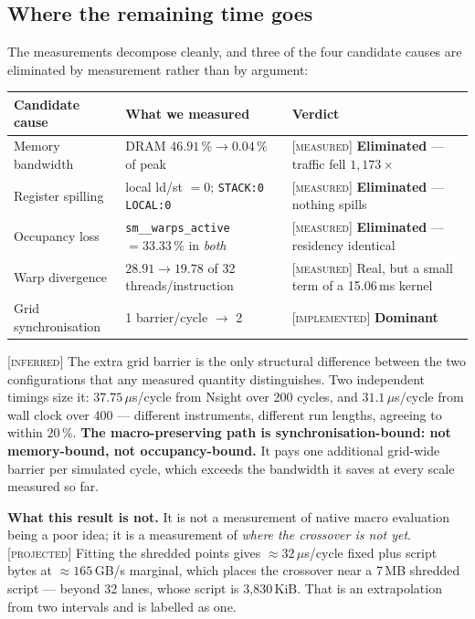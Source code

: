 \documentclass[11pt]{article}
\newcommand{\M}{\textcolor{blue!45!black}{\scriptsize\textsc{[measured]}}}
\newcommand{\I}{\textcolor{note}{\scriptsize\textsc{[implemented]}}}
\newcommand{\F}{\textcolor{purple!60!black}{\scriptsize\textsc{[inferred]}}}
\newcommand{\Pj}{\textcolor{red!55!black}{\scriptsize\textsc{[projected]}}}
\newcommand{\code}[1]{\texttt{\small #1}}
\begin{document}
\subsection{Where the remaining time goes}

The measurements decompose cleanly, and three of the four candidate causes are
eliminated by measurement rather than by argument:

\begin{center}\small
\begin{tabular}{@{}lll@{}}
\toprule
Candidate cause & What we measured & Verdict\\
\midrule
Memory bandwidth      & DRAM $46.91\,\% \to 0.04\,\%$ of peak        & \M{} \textbf{Eliminated} --- traffic fell $1{,}173\times$\\
Register spilling     & local ld/st $=0$; \code{STACK:0 LOCAL:0}     & \M{} \textbf{Eliminated} --- nothing spills\\
Occupancy loss        & \code{sm\_\_warps\_active} $=33.33\,\%$ in \emph{both} & \M{} \textbf{Eliminated} --- residency identical\\
Warp divergence       & $28.91 \to 19.78$ of 32 threads/instruction  & \M{} Real, but a small term of a 15.06\,ms kernel\\
Grid synchronisation  & 1 barrier/cycle $\to$ 2                      & \I{} \textbf{Dominant}\\
\bottomrule
\end{tabular}
\end{center}

\F{} The extra grid barrier is the only structural difference between the two
configurations that any measured quantity distinguishes. Two independent timings size
it: $37.75\,\mu$s/cycle from Nsight over 200 cycles, and $31.1\,\mu$s/cycle from wall
clock over 400 --- different instruments, different run lengths, agreeing to within
$20\,\%$. \textbf{The macro-preserving path is synchronisation-bound: not
memory-bound, not occupancy-bound.} It pays one additional grid-wide barrier per
simulated cycle, which exceeds the bandwidth it saves at every scale measured so far.

\textbf{What this result is not.} It is not a measurement of native macro evaluation
being a poor idea; it is a measurement of \emph{where the crossover is not yet}.
\Pj{} Fitting the shredded points gives $\approx 32\,\mu$s/cycle fixed plus script
bytes at $\approx 165$\,GB/s marginal, which places the crossover near a 7\,MB
shredded script --- beyond 32 lanes, whose script is 3,830\,KiB. That is an
extrapolation from two intervals and is labelled as one.
\end{document}
